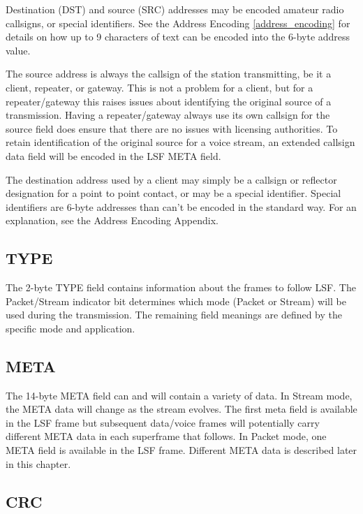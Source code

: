 \documentclass[a4paper,11pt,oneside]{book}
\begin{document}
Destination (DST) and source (SRC) addresses may be encoded amateur radio callsigns, or special identifiers. See the Address Encoding \autoref{address_encoding} for details on how up to 9 characters of text can be encoded into the 6-byte address value.

The source address is always the callsign of the station transmitting, be it a client, repeater, or gateway. This is not a problem for a client, but for a repeater/gateway this raises issues about identifying the original source of a transmission. Having a repeater/gateway always use its own callsign for the source field does ensure that there are no issues with licensing authorities. To retain identification of the original source for a voice stream, an extended callsign data field will be encoded in the LSF META field.

The destination address used by a client may simply be a callsign or reflector designation for a point to point contact, or may be a special identifier. Special identifiers are 6-byte addresses than can't be encoded in the standard way. For an explanation, see the Address Encoding Appendix.

\subsection{TYPE}

The 2-byte TYPE field contains information about the frames to follow LSF. The Packet/Stream indicator bit determines which mode (Packet or Stream) will be used during the transmission. The remaining field meanings are defined by the specific mode and application.

\subsection{META}

The 14-byte META field can and will contain a variety of data. In Stream mode, the META data will change as the stream evolves. The first meta field is available in the LSF frame but subsequent data/voice frames will potentially carry different META data in each superframe that follows. In Packet mode, one META field is available in the LSF frame. Different META data is described later in this chapter.

\subsection{CRC}
\end{document}
